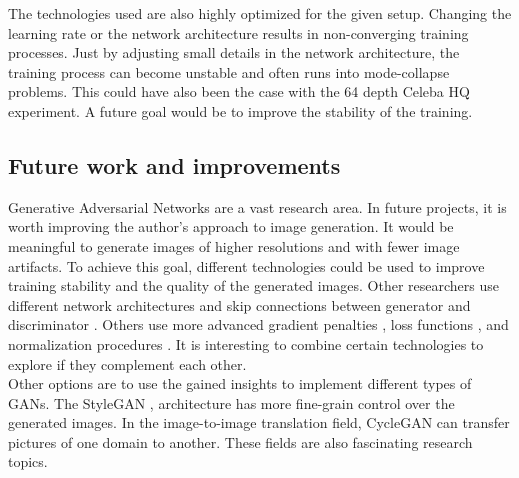 The technologies used are also highly optimized for the given setup. Changing the learning rate or the network architecture results in non-converging training processes. Just by adjusting small details in the network architecture, the training process can become unstable and often runs into mode-collapse problems. This could have also been the case with the 64 depth Celeba HQ experiment. A future goal would be to improve the stability of the training. 

\subsection{Future work and improvements}

Generative Adversarial Networks are a vast research area. In future projects, it is worth improving the author's approach to image generation.   It would be meaningful to generate images of higher resolutions and with fewer image artifacts. To achieve this goal, different technologies could be used to improve training stability and the quality of the generated images.  Other researchers use different network architectures and skip connections between generator and discriminator \cite{karnewar2020msggan}. Others use more advanced gradient penalties \cite{dragan} \cite{wgandiv}, loss functions \cite{realness} \cite{jolicoeurmartineau2018rahinge}, and normalization procedures \cite{miyato2018spectral}. It is interesting to combine certain technologies to explore if they complement each other. \\

Other options are to use the gained insights to implement different types of GANs. The StyleGAN \cite{stylegan}, \cite{stylegan2} architecture has more fine-grain control over the generated images. In the image-to-image translation field, CycleGAN \cite{cyclegan} can transfer pictures of one domain to another. These fields are also fascinating research topics.
